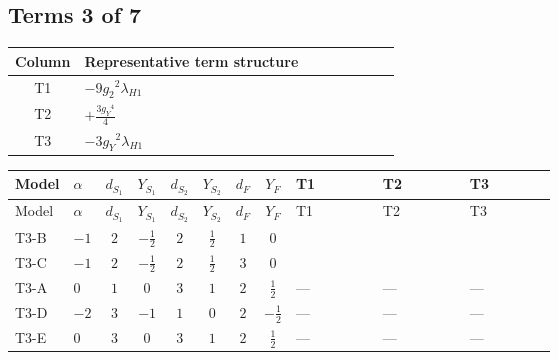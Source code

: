 \documentclass[8pt]{article}
\begin{document}
\begin{landscape}
\subsection*{Terms 3 of 7}
\begin{center}
\begin{tabular}{@{}c >{\raggedright\arraybackslash}p{0.82\linewidth}@{}}
\toprule
Column & Representative term structure \\
\midrule
T1 & \(\displaystyle -9 {g_2}^2 {\lambda_{H1}}\) \\
\midrule
T2 & \(\displaystyle +\frac{3 {g_Y}^4}{4}\) \\
\midrule
T3 & \(\displaystyle -3 {g_Y}^2 {\lambda_{H1}}\) \\
\midrule
\bottomrule
\end{tabular}
\end{center}
\smallskip
\tiny
\begin{longtable}{@{}llcccccc >{\raggedright\arraybackslash}p{0.21\linewidth} >{\raggedright\arraybackslash}p{0.21\linewidth} >{\raggedright\arraybackslash}p{0.21\linewidth}@{}}
\toprule
Model & $\alpha$ & $d_{S_1}$ & $Y_{S_1}$ & $d_{S_2}$ & $Y_{S_2}$ & $d_F$ & $Y_F$ & T1 & T2 & T3 \\
\midrule
\endfirsthead
\toprule
Model & $\alpha$ & $d_{S_1}$ & $Y_{S_1}$ & $d_{S_2}$ & $Y_{S_2}$ & $d_F$ & $Y_F$ & T1 & T2 & T3 \\
\midrule
\endhead
T3-B & $-1$ & $2$ & $-\frac{1}{2}$ & $2$ & $\frac{1}{2}$ & $1$ & $0$ & \scriptsize\adjustbox{max width=\linewidth}{$\begin{gathered} -9 {g_2}^2 {\lambda_{H1}}\end{gathered}$} & \scriptsize\adjustbox{max width=\linewidth}{$\begin{gathered} +\frac{3 {g_Y}^4}{4}\end{gathered}$} & \scriptsize\adjustbox{max width=\linewidth}{$\begin{gathered} -3 {g_Y}^2 {\lambda_{H1}}\end{gathered}$} \\
\midrule
T3-C & $-1$ & $2$ & $-\frac{1}{2}$ & $2$ & $\frac{1}{2}$ & $3$ & $0$ & \scriptsize\adjustbox{max width=\linewidth}{$\begin{gathered} -9 {g_2}^2 {\lambda_{H1}}\end{gathered}$} & \scriptsize\adjustbox{max width=\linewidth}{$\begin{gathered} +\frac{3 {g_Y}^4}{4}\end{gathered}$} & \scriptsize\adjustbox{max width=\linewidth}{$\begin{gathered} -3 {g_Y}^2 {\lambda_{H1}}\end{gathered}$} \\
\midrule
T3-A & $0$ & $1$ & $0$ & $3$ & $1$ & $2$ & $\frac{1}{2}$ & --- & --- & --- \\
\midrule
T3-D & $-2$ & $3$ & $-1$ & $1$ & $0$ & $2$ & $-\frac{1}{2}$ & --- & --- & --- \\
\midrule
T3-E & $0$ & $3$ & $0$ & $3$ & $1$ & $2$ & $\frac{1}{2}$ & --- & --- & --- \\
\midrule
\bottomrule
\end{longtable}
\clearpage

\end{landscape}
\end{document}
